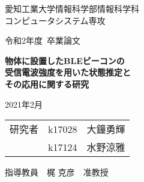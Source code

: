 \thispagestyle{myheadings}

\vspace{-1.0cm}

\begin{center}

{\LARGE 愛知工業大学情報科学部情報科学科\\
コンピュータシステム専攻

\vspace{1.0cm}

令和2年度~卒業論文\\

\vspace{2.0cm}

{\Huge 
\baselineskip=15mm
\textbf{物体に設置したBLEビーコンの\\受信電波強度を用いた状態推定と\\その応用に関する研究\\}}

\vspace{7.0cm}

2021年2月\\

\vspace{1.0cm}

\begin{tabular}[h]{lll}
  研究者  & k17028 & 大鐘勇輝\\
         & k17124 & 水野涼雅\\
\end{tabular}

\vspace{1.0cm}

指導教員\ \ 梶 克彦\ \ 准教授}

\end{center}